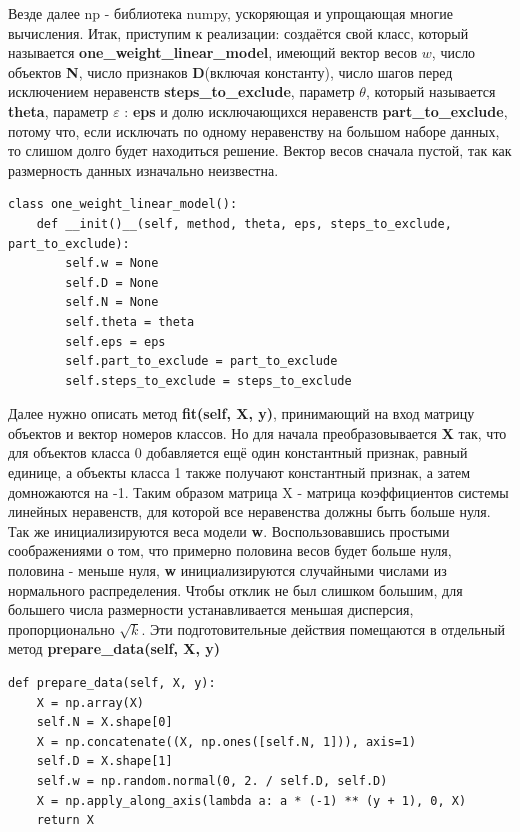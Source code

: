 \documentclass[a4paper]{article}
\begin{document}
Везде далее np - библиотека numpy, ускоряющая и упрощающая многие вычисления. Итак, приступим к реализации: создаётся свой класс, который называется \textbf{one\_weight\_linear\_model}, имеющий вектор весов $w$, число объектов \textbf{N}, число признаков \textbf{D}(включая константу), число шагов перед исключением неравенств \textbf{steps\_to\_exclude}, параметр $\theta$, который называется \textbf{theta}, параметр $\varepsilon$ : \textbf{eps} и долю исключающихся неравенств \textbf{part\_to\_exclude}, потому что, если исключать по одному неравенству на большом наборе данных, то слишом долго будет находиться решение. Вектор весов сначала пустой, так как размерность данных изначально неизвестна.
\begin{lstlisting}
class one_weight_linear_model():
	def __init()__(self, method, theta, eps, steps_to_exclude, part_to_exclude):
		self.w = None
		self.D = None
		self.N = None
		self.theta = theta
		self.eps = eps
		self.part_to_exclude = part_to_exclude
		self.steps_to_exclude = steps_to_exclude
\end{lstlisting}

Далее нужно описать метод \textbf{fit(self, X, y)}, принимающий на вход матрицу объектов и вектор номеров классов. Но для начала преобразовывается \textbf{X} так, что для объектов класса 0 добавляется ещё один константный признак, равный единице, а объекты класса 1 также получают константный признак, а затем домножаются на -1. Таким образом матрица X - матрица коэффициентов системы линейных неравенств, для которой все неравенства должны быть больше нуля. Так же инициализируются веса модели \textbf{w}. Воспользовавшись простыми соображениями о том, что примерно половина весов будет больше нуля, половина - меньше нуля, \textbf{w} инициализируются случайными числами из нормального распределения. Чтобы отклик не был слишком большим, для большего числа размерности устанавливается меньшая дисперсия, пропорционально $\sqrt{k}$. Эти подготовительные действия помещаются в отдельный метод \textbf{prepare\_data(self, X, y)}
\begin{lstlisting}
def prepare_data(self, X, y):
	X = np.array(X)
	self.N = X.shape[0]
	X = np.concatenate((X, np.ones([self.N, 1])), axis=1)
	self.D = X.shape[1]
	self.w = np.random.normal(0, 2. / self.D, self.D)
	X = np.apply_along_axis(lambda a: a * (-1) ** (y + 1), 0, X)
	return X
\end{lstlisting}
\end{document}
